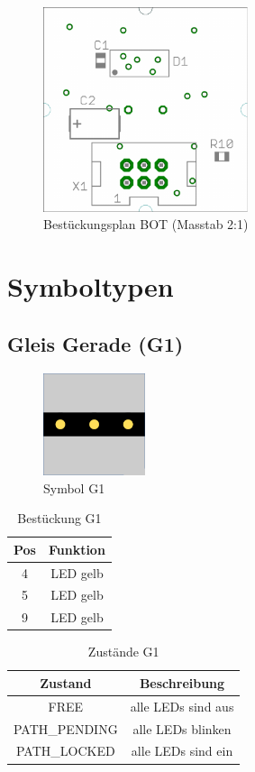\documentclass[10pt,a4paper]{article}
\begin{document}
\begin{figure}[hbtp!]
\centering
\includegraphics[width=6cm]{feld_hw_bot_comp.pdf}
\caption[Bestückungsplan BOT]{Bestückungsplan BOT (Masstab 2:1)}
\end{figure}
\newpage
\section{Symboltypen}


\subsection{Gleis Gerade (G1)}
\begin{figure}[hbtp]
\centering
\includegraphics[width=3cm]{../folien/g1.png}
\caption{Symbol G1}
\end{figure}
\begin{table}[h!]
\centering
\begin{tabular}{c|c}
\textbf{Pos} & \textbf{Funktion} \\ \hline
4 & LED gelb \\
5 & LED gelb \\
9 & LED gelb
\end{tabular}
\caption{Bestückung G1}
\end{table}
\begin{table}[h!]
\centering
\begin{tabular}{c|c}
\textbf{Zustand} & \textbf{Beschreibung} \\ \hline
FREE & alle LEDs sind aus \\
PATH\_PENDING & alle LEDs blinken \\
PATH\_LOCKED & alle LEDs sind ein
\end{tabular}
\caption{Zustände G1}
\end{table}
\end{document}
